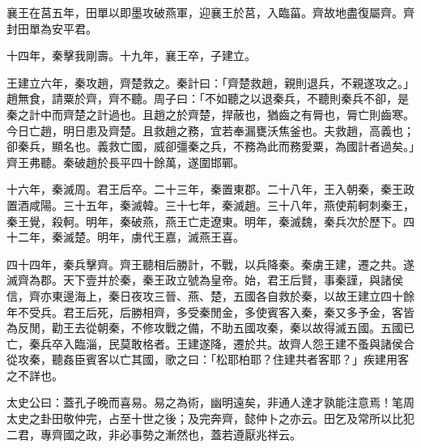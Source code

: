 \begin{pinyinscope}
襄王在莒五年，田單以即墨攻破燕軍，迎襄王於莒，入臨菑。齊故地盡復屬齊。齊封田單為安平君。

十四年，秦擊我剛壽。十九年，襄王卒，子建立。

王建立六年，秦攻趙，齊楚救之。秦計曰：「齊楚救趙，親則退兵，不親遂攻之。」趙無食，請粟於齊，齊不聽。周子曰：「不如聽之以退秦兵，不聽則秦兵不卻，是秦之計中而齊楚之計過也。且趙之於齊楚，捍蔽也，猶齒之有脣也，脣亡則齒寒。今日亡趙，明日患及齊楚。且救趙之務，宜若奉漏甕沃焦釜也。夫救趙，高義也；卻秦兵，顯名也。義救亡國，威卻彊秦之兵，不務為此而務愛粟，為國計者過矣。」齊王弗聽。秦破趙於長平四十餘萬，遂圍邯鄲。

十六年，秦滅周。君王后卒。二十三年，秦置東郡。二十八年，王入朝秦，秦王政置酒咸陽。三十五年，秦滅韓。三十七年，秦滅趙。三十八年，燕使荊軻刺秦王，秦王覺，殺軻。明年，秦破燕，燕王亡走遼東。明年，秦滅魏，秦兵次於歷下。四十二年，秦滅楚。明年，虜代王嘉，滅燕王喜。

四十四年，秦兵擊齊。齊王聽相后勝計，不戰，以兵降秦。秦虜王建，遷之共。遂滅齊為郡。天下壹并於秦，秦王政立號為皇帝。始，君王后賢，事秦謹，與諸侯信，齊亦東邊海上，秦日夜攻三晉、燕、楚，五國各自救於秦，以故王建立四十餘年不受兵。君王后死，后勝相齊，多受秦閒金，多使賓客入秦，秦又多予金，客皆為反閒，勸王去從朝秦，不修攻戰之備，不助五國攻秦，秦以故得滅五國。五國已亡，秦兵卒入臨淄，民莫敢格者。王建遂降，遷於共。故齊人怨王建不蚤與諸侯合從攻秦，聽姦臣賓客以亡其國，歌之曰：「松耶柏耶？住建共者客耶？」疾建用客之不詳也。

太史公曰：蓋孔子晚而喜易。易之為術，幽明遠矣，非通人達才孰能注意焉！笔周太史之卦田敬仲完，占至十世之後；及完奔齊，懿仲卜之亦云。田乞及常所以比犯二君，專齊國之政，非必事勢之漸然也，蓋若遵厭兆祥云。


\end{pinyinscope}